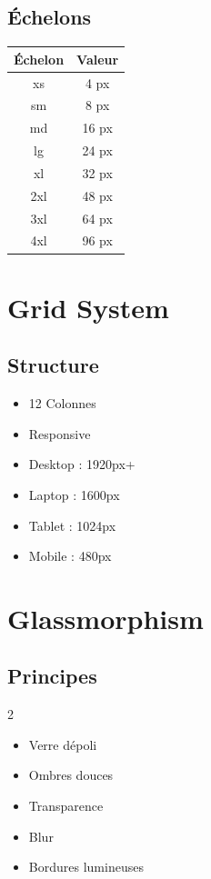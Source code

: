 \documentclass[12pt,a4paper,oneside]{book}
\begin{document}
\section{Échelons}
\begin{center}
\begin{tabular}{|c|c|}
\hline
\rowcolor{violet}
\color{white}Échelon & \color{white}Valeur \\
\hline
xs & 4 px \\
\hline
sm & 8 px \\
\hline
md & 16 px \\
\hline
lg & 24 px \\
\hline
xl & 32 px \\
\hline
2xl & 48 px \\
\hline
3xl & 64 px \\
\hline
4xl & 96 px \\
\hline
\end{tabular}
\end{center}

\chapter{Grid System}

\section{Structure}
\begin{itemize}
\item 12 Colonnes
\item Responsive
\item Desktop : 1920px+
\item Laptop : 1600px
\item Tablet : 1024px
\item Mobile : 480px
\end{itemize}

\chapter{Glassmorphism}

\section{Principes}
\begin{multicols}{2}
\begin{itemize}
\item Verre dépoli
\item Ombres douces
\item Transparence
\item Blur
\item Bordures lumineuses
\end{itemize}
\end{multicols}
\end{document}
